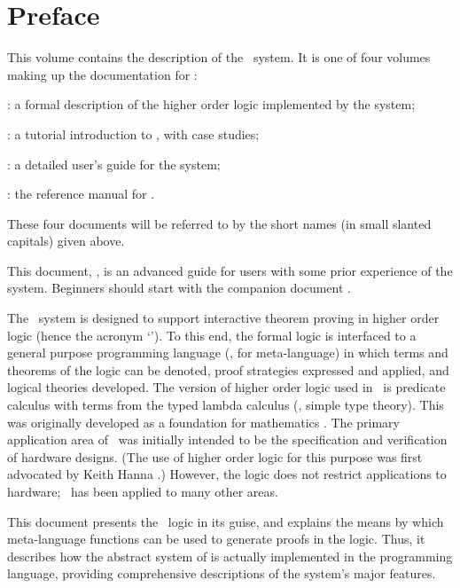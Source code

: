 \chapter*{Preface}
\label{intro}

This volume contains the  description of  the \HOL\  system.
It is one of four volumes making up the documentation for \HOL:

\begin{myenumerate}
\item \LOGIC: a formal description of the higher order logic
  implemented by the \HOL{} system;
\item \TUTORIAL: a tutorial introduction to \HOL, with case studies;
\item \DESCRIPTION: a detailed user's guide for the \HOL{} system;
\item \REFERENCE: the reference manual for \HOL.
\end{myenumerate}

\noindent These four documents will be referred to by the short names (in
small slanted capitals) given above.

This document, \DESCRIPTION, is an advanced guide for users with some
prior experience of the system.  Beginners should start with the
companion document \TUTORIAL.

The \HOL\ system is designed to support interactive theorem proving in
higher order logic (hence the acronym `\HOL').  To this end, the formal
logic is interfaced to a general purpose programming language (\ML, for
meta-language) in which terms and theorems of the logic can be denoted,
proof strategies expressed and applied, and logical theories developed.
The version of higher order logic used in \HOL\ is predicate calculus
with terms from the typed lambda calculus (\ie, simple type
theory). This was originally developed as a foundation for mathematics
\cite{Church}.  The primary application area of \HOL\ was initially
intended to be the specification and verification of hardware designs.
(The use of higher order logic for this purpose was first advocated by
Keith Hanna \cite{Hanna-Daeche}.)  However, the logic does not restrict
applications to hardware; \HOL\ has been applied to many other areas.

This document presents the \HOL\ logic in its \ML{} guise, and
explains the means by which meta-language functions can be used to
generate proofs in the logic.  Thus, it describes how the abstract
system of \LOGIC{} is actually implemented in the \ML{} programming
language, providing comprehensive descriptions of the system's major
features.

